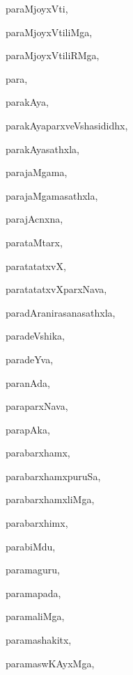 \begin{multicols}{3}
{\noindent
{paraMjoyxVti}, \pageref{paraMjoyxVti}

\noindent
{paraMjoyxVtiliMga}, \pageref{paraMjoyxVtiliMga}

\noindent
{paraMjoyxVtiliRMga}, \pageref{paraMjoyxVtiliRMga}

\noindent
{para}, \pageref{para}

\noindent
{parakAya}, \pageref{parakAya}

\noindent
{parakAyaparxveVshasididhx}, \pageref{parakAyaparxveVshasididhx}

\noindent
{parakAyasathxla}, \pageref{parakAyasathxla}

\noindent
{parajaMgama}, \pageref{parajaMgama}

\noindent
{parajaMgamasathxla}, \pageref{parajaMgamasathxla}

\noindent
{parajAcnxna}, \pageref{parajAcnxna}

\noindent
{parataMtarx}, \pageref{parataMtarx}

\noindent
{paratatatxvX}, \pageref{paratatatxvX}

\noindent
{paratatatxvXparxNava}, \pageref{paratatatxvXparxNava}

\noindent
{paradAranirasanasathxla}, \pageref{paradAranirasanasathxla}

\noindent
{paradeVshika}, \pageref{paradeVshika}

\noindent
{paradeYva}, \pageref{paradeYva}

\noindent
{paranAda}, \pageref{paranAda}

\noindent
{paraparxNava}, \pageref{paraparxNava}

\noindent
{parapAka}, \pageref{parapAka}

\noindent
{parabarxhamx}, \pageref{parabarxhamx}

\noindent
{parabarxhamxpuruSa}, \pageref{parabarxhamxpuruSa}

\noindent
{parabarxhamxliMga}, \pageref{parabarxhamxliMga}

\noindent
{parabarxhimx}, \pageref{parabarxhimx}

\noindent
{parabiMdu}, \pageref{parabiMdu}

\noindent
{paramaguru}, \pageref{paramaguru}

\noindent
{paramapada}, \pageref{paramapada}

\noindent
{paramaliMga}, \pageref{paramaliMga}

\noindent
{paramashakitx}, \pageref{paramashakitx}

\noindent
{paramaswKAyxMga}, \pageref{paramaswKAyxMga}

}
\end{multicols}
